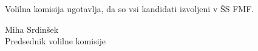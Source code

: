 \documentclass[a4paper,oneside,12pt]{article}
\begin{document}
Volilna komisija ugotavlja, da so vsi kandidati izvoljeni v ŠS FMF.

\vspace{5ex}

\hspace*{\fill} Miha Srdinšek  \\
\hspace*{\fill} Predsednik volilne komisije
\end{document}
